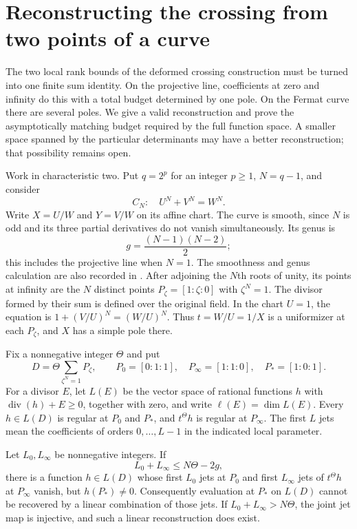 \section{Reconstructing the crossing from two points of a curve}
\label{sec:curve-reconstruction}

The two local rank bounds of the deformed crossing construction
must be turned into one finite sum identity. On the projective
line, coefficients at zero and infinity do this with a total
budget determined by one pole. On the Fermat curve there are
several poles. We give a valid reconstruction and prove the
asymptotically matching budget required by the full function
space. A smaller space spanned by the particular determinants
may have a better reconstruction; that possibility remains open.

Work in characteristic two. Put $q=2^p$ for an integer $p\geq1$,
$N=q-1$, and consider
\[
 C_N:\quad U^N+V^N=W^N.
\]
Write $X=U/W$ and $Y=V/W$ on its affine chart. The curve is
smooth, since $N$ is odd and its three partial derivatives do
not vanish simultaneously. Its genus is
\[
 g=\frac{(N-1)(N-2)}2;
\]
this includes the projective line when $N=1$.
The smoothness and genus calculation are also recorded in
\cite[Tags 0BYA and 0BYD]{StacksCurves}.
After adjoining the $N$th roots of unity, its points at infinity
are the $N$ distinct points $P_\zeta=[1:\zeta:0]$ with
$\zeta^N=1$. The divisor formed by their sum is defined over
the original field. In the chart $U=1$, the equation is
$1+(V/U)^N=(W/U)^N$. Thus $t=W/U=1/X$ is a uniformizer at
each $P_\zeta$, and $X$ has a simple pole there.

Fix a nonnegative integer $\Theta$ and put
\[
 D=\Theta\sum_{\zeta^N=1}P_\zeta,\qquad
 P_0=[0:1:1],\quad P_\infty=[1:1:0],\quad P_*=[1:0:1].
\]
For a divisor $E$, let $L(E)$ be the vector space of rational
functions $h$ with $\operatorname{div}(h)+E\geq0$, together
with zero, and write $\ell(E)=\dim L(E)$.
Every $h\in L(D)$ is regular at $P_0$ and $P_*$, and
$t^\Theta h$ is regular at $P_\infty$.
The first $L$ jets mean the coefficients of orders
$0,\ldots,L-1$ in the indicated local parameter.

\begin{proposition}
\label{prop:fermat-jet-obstruction}
Let $L_0,L_\infty$ be nonnegative integers.
If
\[
 L_0+L_\infty\leq N\Theta-2g,
\]
there is a function $h\in L(D)$ whose first $L_0$ jets at
$P_0$ and first $L_\infty$ jets of $t^\Theta h$ at
$P_\infty$ vanish, but $h(P_*)\ne0$.
Consequently evaluation at $P_*$ on $L(D)$ cannot be recovered
by a linear combination of those jets.
If $L_0+L_\infty>N\Theta$, the joint jet map is injective,
and such a linear reconstruction does exist.
\end{proposition}

